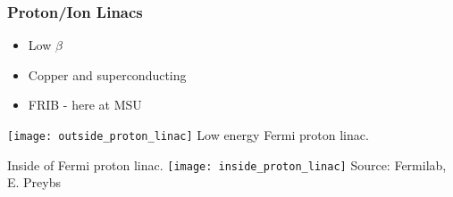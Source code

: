 \documentclass[professionalfonts,t]{beamer}
\begin{document}
\begin{frame}
	\frametitle{Proton/Ion Linacs}

\begin{minipage}{0.45\textwidth}
	\begin{itemize}
		\item Low $\beta$
		\item Copper and superconducting
		\item FRIB - here at MSU
	\end{itemize}
	\centering

	\texttt{[image: outside\_proton\_linac]}
	Low energy Fermi proton linac.
\end{minipage}\hfill
\begin{minipage}{0.45\textwidth}
	\vspace{-1em}
	\centering
	Inside of Fermi proton linac.
	\texttt{[image: inside\_proton\_linac]}
	Source: Fermilab, E. Preybs
\end{minipage}
\end{frame}

\fi

\iftrue
\end{document}
